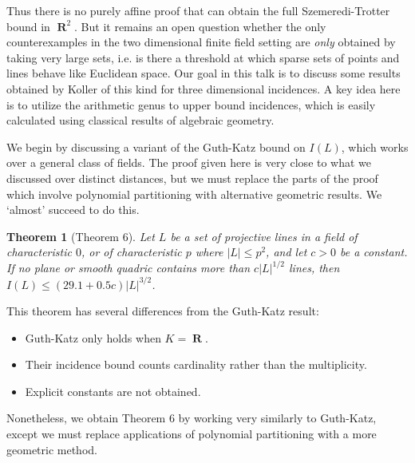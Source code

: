 \documentclass{article}
\theoremstyle{plain}
\newtheorem{theorem}{Theorem}
\theoremstyle{remark}
\newtheorem*{example}{Example}
\theoremstyle{definition}
\DeclareMathOperator{\RR}{\mathbf{R}}
\begin{document}
Thus there is no purely affine proof that can obtain the full Szemeredi-Trotter bound in $\RR^2$. But it remains an open question whether the only counterexamples in the two dimensional finite field setting are {\it only} obtained by taking very large sets, i.e. is there a threshold at which sparse sets of points and lines behave like Euclidean space. Our goal in this talk is to discuss some results obtained by Koller of this kind for three dimensional incidences. A key idea here is to utilize the arithmetic genus to upper bound incidences, which is easily calculated using classical results of algebraic geometry.

We begin by discussing a variant of the Guth-Katz bound on $I(L)$, which works over a general class of fields. The proof given here is very close to what we discussed over distinct distances, but we must replace the parts of the proof which involve polynomial partitioning with alternative geometric results. We `almost' succeed to do this.

\begin{theorem}[Theorem 6]
    Let $L$ be a set of projective lines in a field of characteristic $0$, or of characteristic $p$ where $|L| \leq p^2$, and let $c > 0$ be a constant. If no plane or smooth quadric contains more than $c |L|^{1/2}$ lines, then $I(L) \leq (29.1 + 0.5c) |L|^{3/2}$.
\end{theorem}

This theorem has several differences from the Guth-Katz result:
%
\begin{itemize}
    \item Guth-Katz only holds when $K = \RR$.
    \item Their incidence bound counts cardinality rather than the multiplicity.
    \item Explicit constants are not obtained.
\end{itemize}
%
Nonetheless, we obtain Theorem 6 by working very similarly to Guth-Katz, except we must replace applications of polynomial partitioning with a more geometric method.


\end{document}
